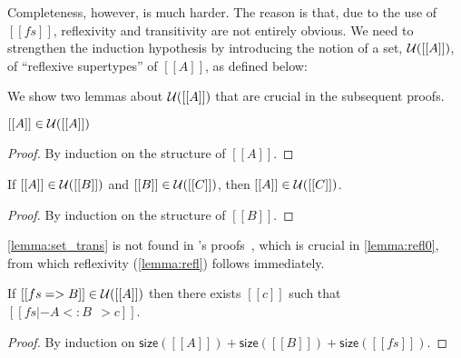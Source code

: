 Completeness, however, is much harder. The reason is that, due to the use of
$[[fs]]$, reflexivity and transitivity are not entirely obvious. We need to
strengthen the induction hypothesis by introducing the notion of a set,
$\mathcal{U}([[A]])$, of ``reflexive supertypes'' of $[[A]]$, as defined below:
We show two lemmas about $\mathcal{U}([[A]])$ that are crucial in the subsequent proofs.
\begin{lemma} \label{lemma:set_refl}
  $[[A]] \in \mathcal{U}([[A]])$
\end{lemma}
\begin{proof}
  By induction on the structure of $[[A]]$.
\end{proof}

\begin{lemma} \label{lemma:set_trans}
  If $[[A]] \in \mathcal{U}([[B]])$ and $[[B]] \in \mathcal{U}([[C]])$, then $[[A]] \in \mathcal{U}([[C]])$.
\end{lemma}
\begin{proof}
  By induction on the structure of $[[B]]$.
\end{proof}

\begin{remark}
  \cref{lemma:set_trans} is not found in \citeauthor{pierce1989decision}'s proofs~\citep{pierce1989decision}, which is
  crucial in \cref{lemma:refl0}, from which reflexivity (\cref{lemma:refl})
  follows immediately.
\end{remark}


\begin{lemma} \label{lemma:refl0}
  If $[[fs => B]] \in \mathcal{U}([[A]])$ then there exists $[[c]]$ such that $[[fs |- A <: B ~~> c]]$.
\end{lemma}
\begin{proof}
  By induction on $\mathsf{size}([[A]]) + \mathsf{size}([[B]]) + \mathsf{size}([[fs]])$.
\end{proof}

